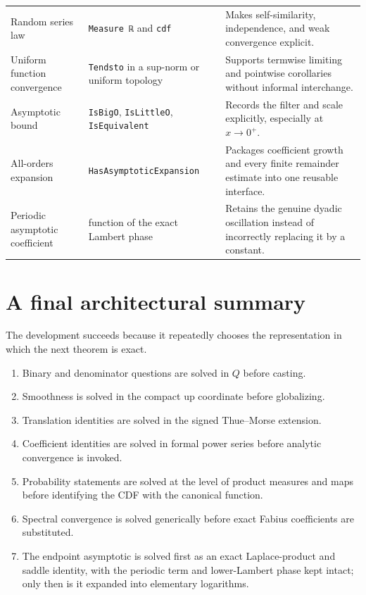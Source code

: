 \documentclass[11pt,a4paper,openany]{book}
\def\Q{Q}
\newcommand{\Q}{\ensuremath{\mathbb{Q}}}
\newcommand{\pathbreak}[1]{\nolinkurl{#1}}
\begin{document}
\begin{longtable}{@{}>{\raggedright\arraybackslash}p{}>{\raggedright\arraybackslash}p{}p{}@{}}
\addlinespace[.35em]
Random series law & \pathbreak{Measure ℝ} and \pathbreak{cdf} & Makes self-similarity, independence, and weak convergence explicit. \\
\addlinespace[.35em]
Uniform function convergence & \pathbreak{Tendsto} in a sup-norm or uniform topology & Supports termwise limiting and pointwise corollaries without informal interchange. \\
\addlinespace[.35em]
Asymptotic bound & \pathbreak{IsBigO}, \pathbreak{IsLittleO}, \pathbreak{IsEquivalent} & Records the filter and scale explicitly, especially at $x\to0^+$. \\
\addlinespace[.35em]
All-orders expansion & \pathbreak{HasAsymptoticExpansion} & Packages coefficient growth and every finite remainder estimate into one reusable interface. \\
\addlinespace[.35em]
Periodic asymptotic coefficient & function of the exact Lambert phase & Retains the genuine dyadic oscillation instead of incorrectly replacing it by a constant. \\
\end{longtable}

\section*{A final architectural summary}
The development succeeds because it repeatedly chooses the representation in
which the next theorem is exact.

\begin{enumerate}
  \item Binary and denominator questions are solved in $\Q$ before casting.
  \item Smoothness is solved in the compact up coordinate before globalizing.
  \item Translation identities are solved in the signed Thue--Morse extension.
  \item Coefficient identities are solved in formal power series before
        analytic convergence is invoked.
  \item Probability statements are solved at the level of product measures and
        maps before identifying the CDF with the canonical function.
  \item Spectral convergence is solved generically before exact Fabius
        coefficients are substituted.
  \item The endpoint asymptotic is solved first as an exact Laplace-product and
        saddle identity, with the periodic term and lower-Lambert phase kept
        intact; only then is it expanded into elementary logarithms.
\end{enumerate}
\end{document}

